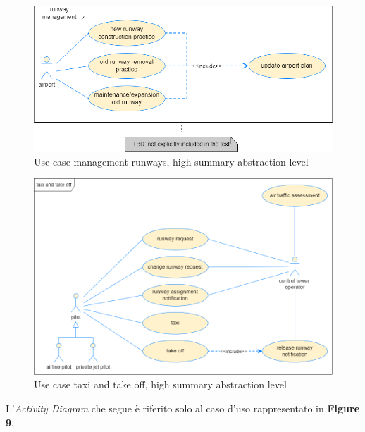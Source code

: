 \documentclass{article}
\begin{document}
\begin{sloppy}
\bigbreak
\begin{figure}[H]
    \centering
    \includegraphics[scale=0.375]{figure8.png}
    \caption{Use case management runways, high summary abstraction level}
    \label{fig:enter-label}
\end{figure}
\bigbreak

\bigbreak
\begin{figure}[H]
    \centering
    \includegraphics[scale=0.325]{figure9.png}
    \caption{Use case taxi and take off, high summary abstraction level}
    \label{fig:enter-label}
\end{figure}
\bigbreak

L'\textit{Activity Diagram} che segue è riferito solo al caso d'uso rappresentato in \textbf{Figure 9}.


\end{sloppy}
\end{document}
